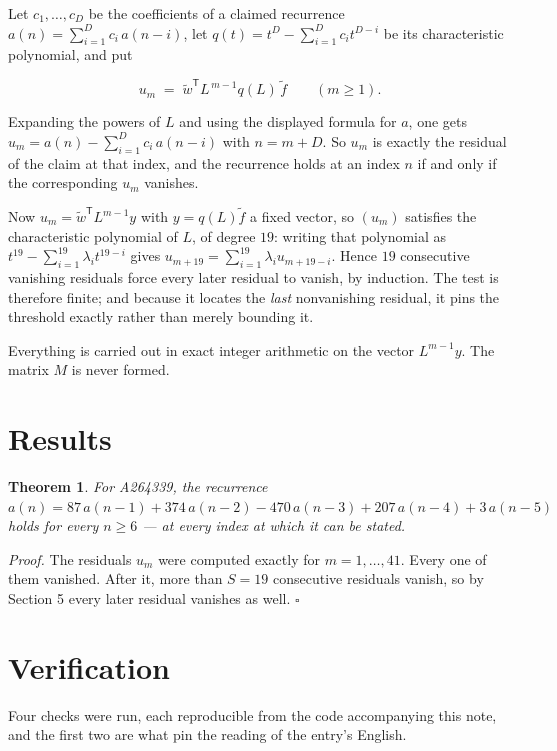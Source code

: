 \documentclass[11pt]{article}
\newtheorem{theorem}{Theorem}
\theoremstyle{definition}
\begin{document}
Let $c_1,\dots,c_D$ be the coefficients of a claimed recurrence $a(n) = \sum_{i=1}^{D} c_i\,a(n-i)$, let $q(t) = t^{D} - \sum_{i=1}^{D} c_i t^{D-i}$ be its characteristic polynomial, and put

\[u_m \;=\; \tilde w^{\mathsf T} L^{\,m-1} q(L)\,\tilde f \qquad (m \ge 1).\]

Expanding the powers of $L$ and using the displayed formula for $a$, one gets $u_m = a(n) - \sum_{i=1}^{D} c_i\,a(n-i)$ with $n = m + D$. So $u_m$ is exactly the residual of the claim at that index, and the recurrence holds at an index $n$ if and only if the corresponding $u_m$ vanishes.

Now $u_m = \tilde w^{\mathsf T} L^{m-1} y$ with $y = q(L)\tilde f$ a fixed vector, so $(u_m)$ satisfies the characteristic polynomial of $L$, of degree $19$: writing that polynomial as $t^{19} - \sum_{i=1}^{19} \lambda_i t^{19-i}$ gives $u_{m+19} = \sum_{i=1}^{19} \lambda_i u_{m+19-i}$. Hence $19$ consecutive vanishing residuals force every later residual to vanish, by induction. The test is therefore finite; and because it locates the {\itshape last} nonvanishing residual, it pins the threshold exactly rather than merely bounding it.

Everything is carried out in exact integer arithmetic on the vector $L^{m-1}y$. The matrix $M$ is never formed.

\section{Results}

\begin{theorem} For A264339, the recurrence $a(n) = 87\,a(n-1) + 374\,a(n-2) - 470\,a(n-3) + 207\,a(n-4) + 3\,a(n-5)$ holds for every $n \ge 6$ --- at every index at which it can be stated.\end{theorem}

{\itshape Proof.} The residuals $u_m$ were computed exactly for $m = 1,\dots,41$. Every one of them vanished. After it, more than $S = 19$ consecutive residuals vanish, so by Section 5 every later residual vanishes as well. $\square$

\section{Verification}

Four checks were run, each reproducible from the code accompanying this note, and the first two are what pin the reading of the entry's English.
\end{document}
